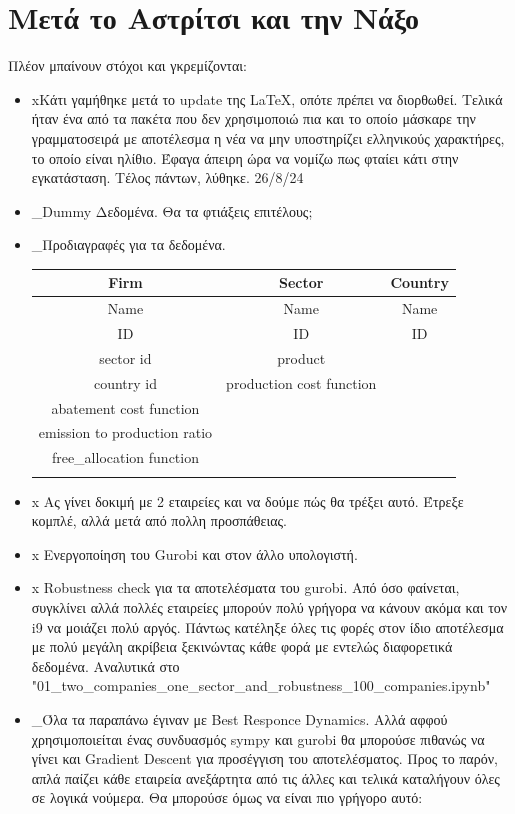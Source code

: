 \documentclass[a4paper,twoside,10pt]{article}
\begin{document}
\section{Μετά το Αστρίτσι και την Νάξο}
Πλέον μπαίνουν στόχοι και γκρεμίζονται:
\begin{itemize}[label={}]
	\item \lbrack x\rbrack Κάτι γαμήθηκε μετά το update της \LaTeX, οπότε πρέπει να διορθωθεί. Τελικά ήταν ένα από τα πακέτα που δεν χρησιμοποιώ πια και το οποίο μάσκαρε την γραμματοσειρά με αποτέλεσμα η νέα να μην υποστηρίζει ελληνικούς χαρακτήρες, το οποίο είναι ηλίθιο. Έφαγα άπειρη ώρα να νομίζω πως φταίει κάτι στην εγκατάσταση. Τέλος πάντων, λύθηκε. 26/8/24
	\item \lbrack\_\rbrack Dummy Δεδομένα. Θα τα φτιάξεις επιτέλους;
	\item \lbrack\_\rbrack Προδιαγραφές για τα δεδομένα.
	\begin{tabular}{|c|c|c|}
		\hline
		Firm & Sector & Country \\
		\hline
		Name & Name & Name \\
		\hline
		ID & ID & ID \\
		\hline
		sector id & product &  \\
		\hline
		country id & production cost function &  \\
		\hline
		abatement cost function &  &  \\
		\hline
		emission to production ratio &  &  \\
		\hline
		free\_allocation function &  &  \\
		\hline
		&  &  \\
		\hline
	\end{tabular}
	\item \lbrack x \rbrack Ας γίνει δοκιμή με 2 εταιρείες και να δούμε πώς θα τρέξει αυτό. Έτρεξε κομπλέ, αλλά μετά από πολλη προσπάθειας. 
	\item \lbrack x \rbrack Ενεργοποίηση του Gurobi και στον άλλο υπολογιστή. 
	\item \lbrack x \rbrack  Robustness check για τα αποτελέσματα του gurobi. Από όσο φαίνεται, συγκλίνει αλλά πολλές εταιρείες μπορούν πολύ γρήγορα να κάνουν ακόμα και τον i9 να μοιάζει πολύ αργός. Πάντως κατέληξε όλες τις φορές στον ίδιο αποτέλεσμα με πολύ μεγάλη ακρίβεια ξεκινώντας κάθε φορά με εντελώς διαφορετικά δεδομένα. Αναλυτικά στο "01\_two\_companies\_one\_sector\_and\_robustness\_100\_companies.ipynb"
	\item \lbrack\_\rbrack Όλα τα παραπάνω έγιναν με Best Responce Dynamics. Αλλά αφφού χρησιμοποιείται ένας συνδυασμός sympy και gurobi θα μπορούσε πιθανώς να γίνει και Gradient Descent για προσέγγιση του αποτελέσματος. Προς το παρόν, απλά παίζει κάθε εταιρεία ανεξάρτητα από τις άλλες και τελικά καταλήγουν όλες σε λογικά νούμερα. Θα μπορούσε όμως να είναι πιο γρήγορο αυτό:

\end{itemize}
\end{document}
